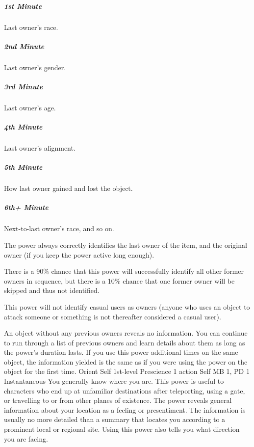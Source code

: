 \subparagraph{1st Minute}
  Last owner's race.
\subparagraph{2nd Minute}
  Last owner's gender.
\subparagraph{3rd Minute}
  Last owner's age.
\subparagraph{4th Minute}
  Last owner's alignment.
\subparagraph{5th Minute}
  How last owner gained and lost the object.
\subparagraph{6th+ Minute}
  Next-to-last owner's race, and so on.

The power always correctly identifies the last owner of the item,
and the original owner
(if you keep the power active long enough).

There is a 90\% chance
that this power will successfully identify all other former owners
in sequence,
but there is a 10\% chance that one former owner
will be skipped and thus not identified.

This power will not identify casual users as owners
(anyone who uses an object to attack someone
or something is not thereafter considered a casual user).

An object without any previous owners reveals no information.
You can continue to run through a list of previous owners
and learn details about them as long as the power's duration lasts.
If you use this power additional times on the same object,
the information yielded is the same
as if you were using the power on the object for the first time.
\DndPowerHeader%
    {Orient Self\label{pwr:orient_self}}
    {1st-level Prescience}
    {1 action}
    {Self}
    {MB 1, PD 1}
    {Instantaneous}
You generally know where you are. This power
is useful to characters who end up at unfamiliar destinations
after teleporting, using a gate, or travelling to or from
other planes of existence. The power reveals general information
about your location as a feeling or presentiment. The information
is usually no more detailed than a summary that locates you
according to a prominent local or regional site. Using this
power also tells you what direction you are facing.

